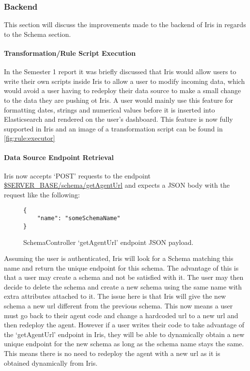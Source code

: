 \documentclass[12pt,a4paper,titlepage]{report}
\begin{document}
\subsubsection{Backend}
This section will discuss the improvements made to the backend of Iris in regards to the Schema section.

\paragraph{Transformation/Rule Script Execution}
\label{para:rule:executor:backend}
In the Semester 1 report it was briefly discussed that Iris would allow users to write their own scripts inside Iris to allow a user to modify incoming data, which would avoid a user having to redeploy their data source to make a small change to the data they are pushing ot Iris. A user would mainly use this feature for formatting dates, strings and numerical values before it is inserted into Elasticsearch and rendered on the user's dashboard. This feature is now fully supported in Iris and an image of a transformation script can be found in \cref{fig:rule:executor}

\paragraph{Data Source Endpoint Retrieval}
Iris now accepts `POST' requests to the endpoint \url{$SERVER_BASE/schema/getAgentUrl} and expects a JSON body with the request like the following:

\begin{figure}[H]
\begin{tcolorbox}
\begin{verbatim}
{
    "name": "someSchemaName"
}
\end{verbatim}
\end{tcolorbox}
\caption{SchemaController `getAgentUrl' endpoint JSON payload.}
\end{figure}
Assuming the user is authenticated, Iris will look for a Schema matching this name and return the unique endpoint for this schema. The advantage of this is that a user may create a schema and not be satisfied with it. The user may then decide to delete the schema and create a new schema using the same name with extra attributes attached to it. The issue here is that Iris will give the new schema a new url different from the previous schema. This now means a user must go back to their agent code and change a hardcoded url to a new url and then redeploy the agent. However if a user writes their code to take advantage of the `getAgentUrl' endpoint in Iris, they will be able to dynamically obtain a new unique endpoint for the new schema as long as the schema name stays the same. This means there is no need to redeploy the agent with a new url as it is obtained dynamically from Iris.
\end{document}
